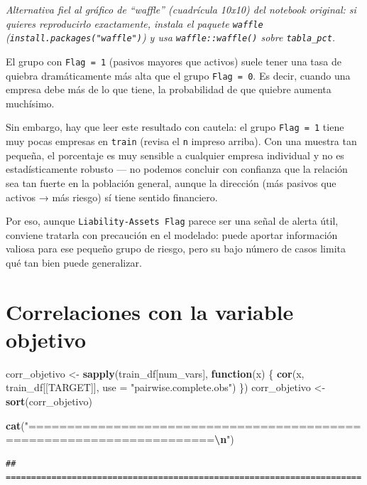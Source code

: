 \documentclass[
]{book}
\newenvironment{Shaded}{\begin{snugshade}}{\end{snugshade}}
\newcommand{\AttributeTok}[1]{\textcolor[rgb]{0.13,0.29,0.53}{#1}}
\newcommand{\ControlFlowTok}[1]{\textcolor[rgb]{0.13,0.29,0.53}{\textbf{#1}}}
\newcommand{\FunctionTok}[1]{\textcolor[rgb]{0.13,0.29,0.53}{\textbf{#1}}}
\newcommand{\NormalTok}[1]{#1}
\newcommand{\OtherTok}[1]{\textcolor[rgb]{0.56,0.35,0.01}{#1}}
\newcommand{\SpecialCharTok}[1]{\textcolor[rgb]{0.81,0.36,0.00}{\textbf{#1}}}
\newcommand{\StringTok}[1]{\textcolor[rgb]{0.31,0.60,0.02}{#1}}
\begin{document}
\emph{Alternativa fiel al gráfico de ``waffle'' (cuadrícula 10x10) del notebook original: si
quieres reproducirlo exactamente, instala el paquete \texttt{waffle}
(\texttt{install.packages("waffle")}) y usa \texttt{waffle::waffle()} sobre \texttt{tabla\_pct}.}

El grupo con \texttt{Flag\ =\ 1} (pasivos mayores que activos) suele tener una tasa de quiebra
dramáticamente más alta que el grupo \texttt{Flag\ =\ 0}. Es decir, cuando una empresa debe más
de lo que tiene, la probabilidad de que quiebre aumenta muchísimo.

Sin embargo, hay que leer este resultado con cautela: el grupo \texttt{Flag\ =\ 1} tiene muy
pocas empresas en \texttt{train} (revisa el \texttt{n} impreso arriba). Con una muestra tan pequeña,
el porcentaje es muy sensible a cualquier empresa individual y no es estadísticamente
robusto --- no podemos concluir con confianza que la relación sea tan fuerte en la
población general, aunque la dirección (más pasivos que activos → más riesgo) sí
tiene sentido financiero.

Por eso, aunque \texttt{Liability-Assets\ Flag} parece ser una señal de alerta útil, conviene
tratarla con precaución en el modelado: puede aportar información valiosa para ese
pequeño grupo de riesgo, pero su bajo número de casos limita qué tan bien puede
generalizar.

\section{Correlaciones con la variable objetivo}\label{correlaciones-con-la-variable-objetivo}

\begin{Shaded}
\begin{Highlighting}[]
\NormalTok{corr\_objetivo }\OtherTok{\textless{}{-}} \FunctionTok{sapply}\NormalTok{(train\_df[num\_vars], }\ControlFlowTok{function}\NormalTok{(x) \{}
  \FunctionTok{cor}\NormalTok{(x, train\_df[[TARGET]], }\AttributeTok{use =} \StringTok{"pairwise.complete.obs"}\NormalTok{)}
\NormalTok{\})}
\NormalTok{corr\_objetivo }\OtherTok{\textless{}{-}} \FunctionTok{sort}\NormalTok{(corr\_objetivo)}

\FunctionTok{cat}\NormalTok{(}\StringTok{"======================================================================}\SpecialCharTok{\textbackslash{}n}\StringTok{"}\NormalTok{)}
\end{Highlighting}
\end{Shaded}

\begin{verbatim}
## ======================================================================
\end{verbatim}
\end{document}
